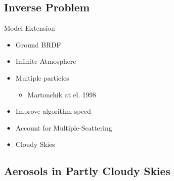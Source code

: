 \documentclass[compress,red,12pt]{beamer}
\begin{document}

\subsection{Inverse Problem}

\begin{frame}{Model Extension}
  \begin{itemize}
  \item Ground BRDF
  \item Infinite Atmosphere
  \item Multiple particles
    \begin{itemize}
    \item Martonchik at el. 1998
    \end{itemize}
  \item Improve algorithm speed
  \item Account for Multiple-Scattering
  \item Cloudy Skies
  \end{itemize}

\end{frame}


\subsection{Aerosols in Partly Cloudy Skies}
\end{document}
